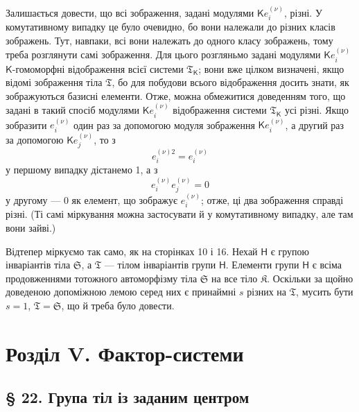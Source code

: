 \documentclass[11pt]{article}
\begin{document}
Залишається довести, що всі зображення, задані модулями \(\mathsf K e_i^{(\nu)}\), різні. У комутативному випадку це було очевидно, бо вони належали до різних класів зображень. Тут, навпаки, всі вони належать до одного класу зображень, тому треба розглянути самі зображення. Для цього розгляньмо задані модулями \(\mathsf K e_i^{(\nu)}\) \(\mathsf{K}\)-гомоморфні відображення всієї системи \(\mathfrak T_{\mathsf{K}}\); вони вже цілком визначені, якщо відомі зображення тіла \(\mathfrak T\), бо для побудови всього відображення досить знати, як зображуються базисні елементи. Отже, можна обмежитися доведенням того, що задані в такий спосіб модулями \(\mathsf K e_i^{(\nu)}\) відображення системи \(\mathfrak T_{\mathsf{K}}\) усі різні. Якщо зобразити \(e_i^{(\nu)}\) один раз за допомогою модуля зображення \(\mathsf K e_i^{(\nu)}\), а другий раз за допомогою \(\mathsf K e_j^{(\nu)}\), то з
\[
e_i^{(\nu)2}=e_i^{(\nu)}
\]
у першому випадку дістанемо 1, а з
\[
e_i^{(\nu)}e_j^{(\nu)}=0
\]
у другому --- 0 як елемент, що зображує \(e_i^{(\nu)}\); отже, ці два зображення справді різні. (Ті самі міркування можна застосувати й у комутативному випадку, але там вони зайві.)

Відтепер міркуємо так само, як на сторінках 10 і 16. Нехай \(\mathsf{H}\) є групою інваріантів тіла \(\mathfrak S\), а \(\mathfrak T\) --- тілом інваріантів групи \(\mathsf{H}\). Елементи групи \(\mathsf{H}\) є всіма продовженнями тотожного автоморфізму тіла \(\mathfrak S\) на все тіло \(\mathfrak K\). Оскільки за щойно доведеною допоміжною лемою серед них є принаймні \(s\) різних на \(\mathfrak T\), мусить бути \(s=1\), \(\mathfrak T=\mathfrak S\), що й треба було довести.

\section*{Розділ V. Фактор-системи}\label{kapitel-v.-faktorensysteme}

\subsection*{§ 22. Група тіл із заданим центром}\label{die-gruppe-der-koerper-mit-gegebenem-zentrum}
\end{document}
